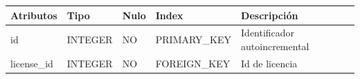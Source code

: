 \documentclass[12pt,a4paperpaper,]{report}
\begin{document}
\begin{longtable}[]{@{}lllll@{}}
\toprule
\begin{minipage}[b]{0.21\columnwidth}\raggedright\strut
Atributos\strut
\end{minipage} & \begin{minipage}[b]{0.19\columnwidth}\raggedright\strut
Tipo\strut
\end{minipage} & \begin{minipage}[b]{0.16\columnwidth}\raggedright\strut
Nulo\strut
\end{minipage} & \begin{minipage}[b]{0.19\columnwidth}\raggedright\strut
Index\strut
\end{minipage} & \begin{minipage}[b]{0.11\columnwidth}\raggedright\strut
Descripción\strut
\end{minipage}\tabularnewline
\midrule
\endhead
\begin{minipage}[t]{0.21\columnwidth}\raggedright\strut
id\strut
\end{minipage} & \begin{minipage}[t]{0.19\columnwidth}\raggedright\strut
INTEGER\strut
\end{minipage} & \begin{minipage}[t]{0.16\columnwidth}\raggedright\strut
NO\strut
\end{minipage} & \begin{minipage}[t]{0.19\columnwidth}\raggedright\strut
PRIMARY\_KEY\strut
\end{minipage} & \begin{minipage}[t]{0.11\columnwidth}\raggedright\strut
Identificador autoincremental\strut
\end{minipage}\tabularnewline
\begin{minipage}[t]{0.21\columnwidth}\raggedright\strut
license\_id\strut
\end{minipage} & \begin{minipage}[t]{0.19\columnwidth}\raggedright\strut
INTEGER\strut
\end{minipage} & \begin{minipage}[t]{0.16\columnwidth}\raggedright\strut
NO\strut
\end{minipage} & \begin{minipage}[t]{0.19\columnwidth}\raggedright\strut
FOREIGN\_KEY\strut
\end{minipage} & \begin{minipage}[t]{0.11\columnwidth}\raggedright\strut
Id de licencia\strut

\end{minipage}
\end{longtable}
\end{document}
